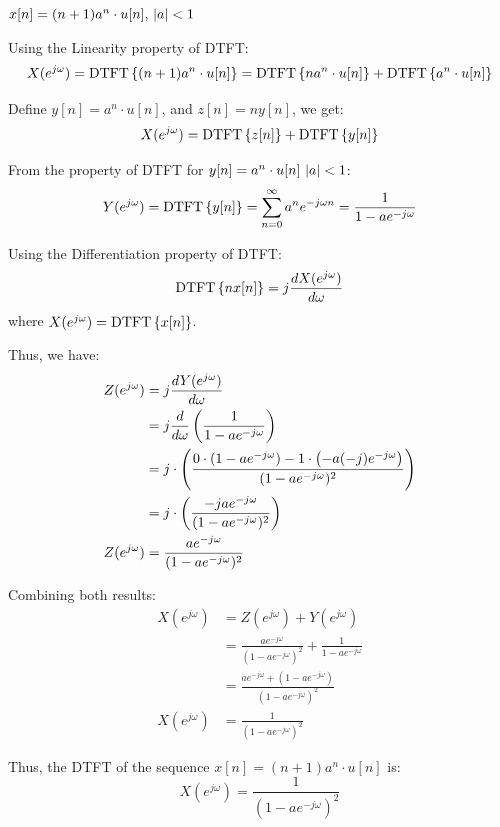 \documentclass[a4paper, 10pt]{article}
\begin{document}
\begin{tosubmit}
\begin{subsubproblems}[start=3]
    \item \( x[n] =  (n+1)a^n \cdot u[n], \, \left|a\right| < 1 \)
\end{subsubproblems}

\par\noindent\submitsolution
Using the Linearity property of DTFT:
\[ X(e^{j\omega}) = \text{DTFT}\left\{ (n+1)a^n \cdot u[n] \right\} = \text{DTFT}\left\{ na^n \cdot u[n] \right\} + \text{DTFT}\left\{ a^n \cdot u[n] \right\} \]

Define \( y[n] = a^n \cdot u[n] \), and \( z[n] = n y[n] \), we get:
\[ X(e^{j\omega}) = \text{DTFT}\left\{ z[n] \right\} + \text{DTFT}\left\{ y[n] \right\} \]

From the property of DTFT for \( y[n] = a^n \cdot u[n] \, \left|a\right| < 1 \):
\[ Y(e^{j\omega}) = \text{DTFT}\left\{ y[n] \right\} = \sum_{n=0}^{\infty} a^n e^{-j\omega n} = \frac{1}{1 - a e^{-j\omega}} \]

Using the Differentiation property of DTFT:
\[ \text{DTFT}\left\{ n x[n] \right\} = j \frac{dX(e^{j\omega})}{d\omega} \]
where \( X(e^{j\omega}) = \text{DTFT}\left\{ x[n] \right\} \).

Thus, we have:
\begin{align*}
    Z(e^{j\omega}) &= j \frac{dY(e^{j\omega})}{d\omega} \\
    &= j \frac{d}{d\omega} \left( \frac{1}{1 - a e^{-j\omega}} \right) \\
    &= j \cdot \left( \frac{0 \cdot (1 - a e^{-j\omega}) - 1 \cdot \left( -a (-j) e^{-j\omega} \right) }{(1 - a e^{-j\omega})^2} \right) \\
    &= j \cdot \left( \frac{ -j a e^{-j\omega} }{(1 - a e^{-j\omega})^2} \right) \\
    Z(e^{j\omega}) &= \frac{ a e^{-j\omega} }{(1 - a e^{-j\omega})^2}
\end{align*}

Combining both results:
\begin{align*}
    X(e^{j\omega}) &= Z(e^{j\omega}) + Y(e^{j\omega}) \\
    &= \frac{ a e^{-j\omega} }{(1 - a e^{-j\omega})^2} + \frac{1}{1 - a e^{-j\omega}} \\
    &= \frac{ a e^{-j\omega} + (1 - a e^{-j\omega}) }{(1 - a e^{-j\omega})^2} \\
    X(e^{j\omega}) &= \frac{ 1 }{(1 - a e^{-j\omega})^2}
\end{align*}

Thus, the DTFT of the sequence \( x[n] = (n+1)a^n \cdot u[n] \) is:
\[ \boxed{ X(e^{j\omega}) = \frac{ 1 }{(1 - a e^{-j\omega})^2} } \]
\end{tosubmit}
\end{document}
